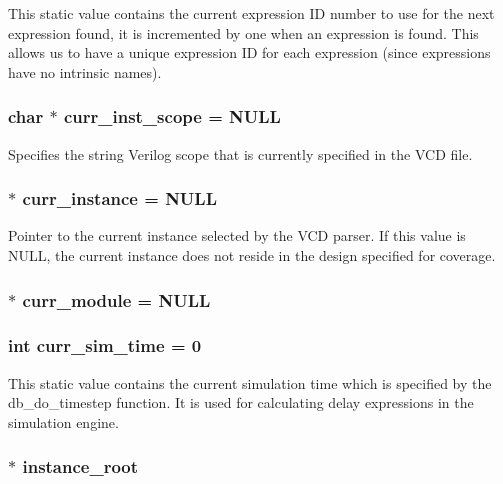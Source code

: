 This static value contains the current expression ID number to use for the next expression found, it is incremented by one when an expression is found. This allows us to have a unique expression ID for each expression (since expressions have no intrinsic names). 
\subsubsection{\setlength{\rightskip}{0pt plus 5cm}char $\ast$ curr\_\-inst\_\-scope = NULL}\label{db_8c_a8}


Specifies the string Verilog scope that is currently specified in the VCD file. 
\subsubsection{ $\ast$ curr\_\-instance = NULL}\label{db_8c_a9}


Pointer to the current instance selected by the VCD parser. If this value is NULL, the current instance does not reside in the design specified for coverage. 
\subsubsection{ $\ast$ curr\_\-module = NULL}\label{db_8c_a12}


\subsubsection{\setlength{\rightskip}{0pt plus 5cm}int curr\_\-sim\_\-time = 0}\label{db_8c_a16}


This static value contains the current simulation time which is specified by the db\_\-do\_\-timestep function. It is used for calculating delay expressions in the simulation engine. 
\subsubsection{$\ast$ instance\_\-root}\label{db_8c_a1}



